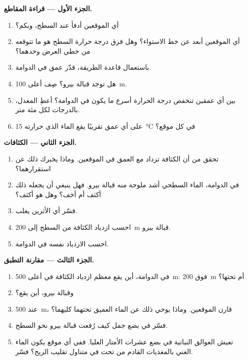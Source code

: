 \begin{problem}
\medskip
\noindent\textbf{الجزء الأول --- قراءة المقاطع.}
\begin{enumerate}
  \item أي الموقعين أدفأ عند السطح، وبكم؟
  \item أي الموقعين أبعد عن خط الاستواء؟ وهل فرق درجة حرارة السطح هو ما تتوقعه من
        خطي العرض وحدهما؟
  \item باستعمال قاعدة الطريقة، قدّر عمق 
        في الدوامة.
  \item هل توجد  قبالة بيرو؟ صِف أعلى \qty{100}{m}.
  \item بين أي عمقين تنخفض درجة الحرارة أسرع ما يكون في الدوامة؟
        أعطِ المعدل، بالدرجات لكل مئة متر.
  \item على أي عمق تقريبًا يقع الماء الذي حرارته \qty{15}{\degreeCelsius} في
        كل موقع؟
\end{enumerate}

\medskip
\noindent\textbf{الجزء الثاني --- الكثافات.}
\begin{enumerate}[resume]
  \item تحقق من أن الكثافة تزداد مع العمق في الموقعين. وماذا يخبرك ذلك عن
        استقرارهما؟
  \item في الدوامة، الماء السطحي أشد ملوحة منه قبالة بيرو. فهل ينبغي أن يجعله ذلك
        أكثف أم أخف؟ وهل هو أكثف؟
  \item فسّر أي الأثرين يغلب.
  \item احسب ازدياد الكثافة من السطح إلى \qty{200}{m}
        قبالة بيرو.
  \item احسب الازدياد نفسه في الدوامة.
\end{enumerate}

\medskip
\noindent\textbf{الجزء الثالث --- مقارنة التطبق.}
\begin{enumerate}[resume]
  \item في الدوامة، أين يقع معظم ازدياد الكثافة في أعلى
        \qty{500}{m}: فوق \qty{200}{m} أم تحتها؟
  \item وقبالة بيرو، أين يقع؟
  \item عند \qty{500}{m}، قارن الموقعين. وماذا يوحي ذلك عن
        الماء العميق تحتهما كليهما؟
  \item فسّر في بضع جمل كيف رُفعت  قبالة بيرو نحو
        السطح.
  \item تعيش العوالق النباتية في بضع عشرات الأمتار العليا. ففي أي موقع يكون
        الماء الغني بالمغذيات القادم من تحت  في متناول
        تقليب الريح؟ فسّر.
\end{enumerate}


\end{problem}
